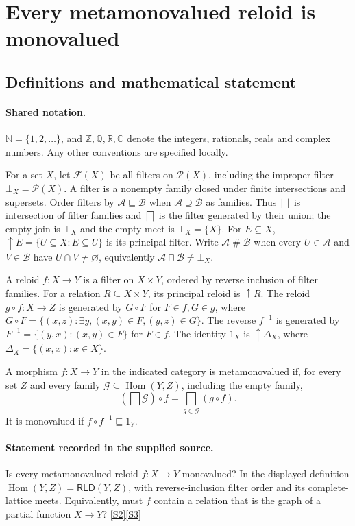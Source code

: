 \documentclass[11pt]{article}
\newcommand{\sref}[2]{\hyperlink{source:#1:#2}{[S#2]}}
\begin{document}
\section{Every metamonovalued reloid is monovalued}\label{statement}

\subsection{Definitions and mathematical statement}

\paragraph{Shared notation.}$\mathbb N=\{1,2,\ldots\}$, and $\mathbb Z,\mathbb Q,\mathbb R,\mathbb C$ denote the integers, rationals, reals and complex numbers. Any other conventions are specified locally.


For a set $X$, let $\mathcal F(X)$ be all filters on $\mathcal P(X)$, including the improper filter $\bot_X=\mathcal P(X)$. A filter is a nonempty family closed under finite intersections and supersets. Order filters by $\mathcal A\sqsubseteq\mathcal B$ when $\mathcal A\supseteq\mathcal B$ as families. Thus $\bigsqcup$ is intersection of filter families and $\bigsqcap$ is the filter generated by their union; the empty join is $\bot_X$ and the empty meet is $\top_X=\{X\}$. For $E\subseteq X$, $\uparrow E=\{U\subseteq X:E\subseteq U\}$ is its principal filter. Write $\mathcal A\mathrel{\#}\mathcal B$ when every $U\in\mathcal A$ and $V\in\mathcal B$ have $U\cap V\ne\varnothing$, equivalently $\mathcal A\sqcap\mathcal B\ne\bot_X$.

A reloid $f:X\to Y$ is a filter on $X\times Y$, ordered by reverse inclusion of filter families. For a relation $R\subseteq X\times Y$, its principal reloid is $\uparrow R$. The reloid $g\circ f:X\to Z$ is generated by $G\circ F$ for $F\in f,G\in g$, where $G\circ F=\{(x,z):\exists y,(x,y)\in F,(y,z)\in G\}$. The reverse $f^{-1}$ is generated by $F^{-1}=\{(y,x):(x,y)\in F\}$ for $F\in f$. The identity $1_X$ is $\uparrow\Delta_X$, where $\Delta_X=\{(x,x):x\in X\}$.

A morphism $f:X\to Y$ in the indicated category is metamonovalued if, for every set $Z$ and every family $\mathcal G\subseteq\operatorname{Hom}(Y,Z)$, including the empty family,
\[
 \left(\bigsqcap\mathcal G\right)\circ f
 =\bigsqcap_{g\in\mathcal G}(g\circ f).
\]
It is monovalued if $f\circ f^{-1}\sqsubseteq1_Y$.
\paragraph{Statement recorded in the supplied source.}
Is every metamonovalued reloid $f:X\to Y$ monovalued? In the displayed definition $\operatorname{Hom}(Y,Z)=\mathsf{RLD}(Y,Z)$, with reverse-inclusion filter order and its complete-lattice meets. Equivalently, must $f$ contain a relation that is the graph of a partial function $X\to Y$? \sref{statement}{2}\sref{statement}{3}
\end{document}

